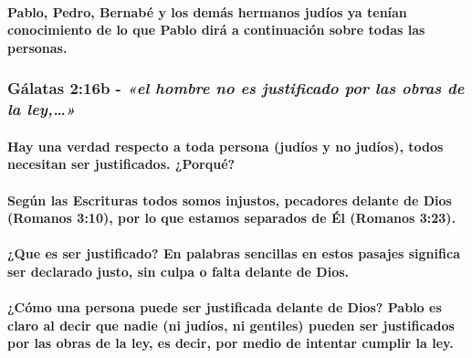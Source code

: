 \documentclass[11a pt,twoside]{article}
\newcommand{\scripture}[1]{%
  {\fontsize{12pt}{16pt}\selectfont\ScriptureFont\itshape #1}%
}
\let\oldsubsubsection\subsubsection
\renewcommand{\subsubsection}{\needspace{4\baselineskip}\oldsubsubsection}
\let\oldparagraph\paragraph
\renewcommand{\paragraph}{\needspace{3\baselineskip}\oldparagraph}
\begin{document}
\paragraph{Pablo, Pedro, Bernabé y los demás hermanos judíos ya tenían
conocimiento de lo que Pablo dirá a continuación sobre todas las
personas.}\label{pablo-pedro-bernabuxe9-y-los-demuxe1s-hermanos-juduxedos-ya-tenuxedan-conocimiento-de-lo-que-pablo-diruxe1-a-continuaciuxf3n-sobre-todas-las-personas.}

\subsubsection{\texorpdfstring{Gálatas 2:16b -
\scripture{«el hombre no es justificado por las obras de la ley,…»}}{Gálatas 2:16b - }}\label{guxe1latas-216b---el-hombre-no-es-justificado-por-las-obras-de-la-ley}

\paragraph{Hay una verdad respecto a toda persona (judíos y no judíos),
todos necesitan ser justificados.
¿Porqué?}\label{hay-una-verdad-respecto-a-toda-persona-juduxedos-y-no-juduxedos-todos-necesitan-ser-justificados.-porquuxe9}

\paragraph{Según las Escrituras todos somos injustos, pecadores delante
de Dios (Romanos 3:10), por lo que estamos separados de Él (Romanos
3:23).}\label{seguxfan-las-escrituras-todos-somos-injustos-pecadores-delante-de-dios-romanos-310-por-lo-que-estamos-separados-de-uxe9l-romanos-323.}

\paragraph{¿Que es ser justificado? En palabras sencillas en estos
pasajes significa ser declarado justo, sin culpa o falta delante de
Dios.}\label{que-es-ser-justificado-en-palabras-sencillas-en-estos-pasajes-significa-ser-declarado-justo-sin-culpa-o-falta-delante-de-dios.}

\paragraph{¿Cómo una persona puede ser justificada delante de Dios?
Pablo es claro al decir que nadie (ni judíos, ni gentiles) pueden ser
justificados por las obras de la ley, es decir, por medio de intentar
cumplir la
ley.}\label{cuxf3mo-una-persona-puede-ser-justificada-delante-de-dios-pablo-es-claro-al-decir-que-nadie-ni-juduxedos-ni-gentiles-pueden-ser-justificados-por-las-obras-de-la-ley-es-decir-por-medio-de-intentar-cumplir-la-ley.}
\end{document}
